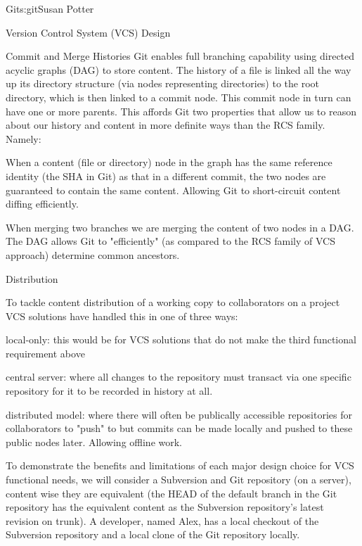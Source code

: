 \begin{aosachapter}{Git}{s:git}{Susan Potter}
\begin{aosasect1}{Version Control System (VCS) Design}
\begin{aosasect2}{Commit and Merge Histories}
Git enables full branching capability using directed acyclic
graphs (DAG) to store content. The history of a file is linked all the way
up its directory structure (via nodes representing directories) to the root
directory, which is then linked to a commit node. This commit node in turn
can have one or more parents. This affords Git two
properties that allow us to reason about our history and content in
more definite ways than the RCS family. Namely:
\begin{aosaitemize}
  \item When a content (file or directory) node in the graph has the same
  reference identity (the SHA in Git) as that in a different commit, the two
  nodes are guaranteed to contain the same content. Allowing Git to
  short-circuit content diffing efficiently.
  \item When merging two branches we are merging the content of two nodes
  in a DAG. The DAG allows Git to "efficiently" (as compared to the
  RCS family of VCS approach) determine common ancestors.
\end{aosaitemize}

\end{aosasect2}
\begin{aosasect2}{Distribution}

To tackle content distribution of a working copy to collaborators on a
project VCS solutions have handled this in one of three ways:
\begin{aosaitemize}
  \item local-only: this would be for VCS solutions that do not make the
    third functional requirement above
  \item central server: where all changes to the repository must transact
    via one specific repository for it to be recorded in history at all.
  \item distributed model: where there will often be publically accessible
    repositories for collaborators to "push" to but commits can be made
    locally and pushed to these public nodes later. Allowing offline work.
\end{aosaitemize}

\end{aosasect2}

To demonstrate the benefits and limitations of each major design choice
for VCS functional needs, we will consider a Subversion and Git repository
(on a server), content wise they are equivalent (the HEAD of the default
branch in the Git repository has the equivalent content as the Subversion
repository's latest revision on trunk). A developer, named Alex,
has a local checkout of the Subversion repository and a local clone of the
Git repository locally.


\end{aosasect1}
\end{aosachapter}
